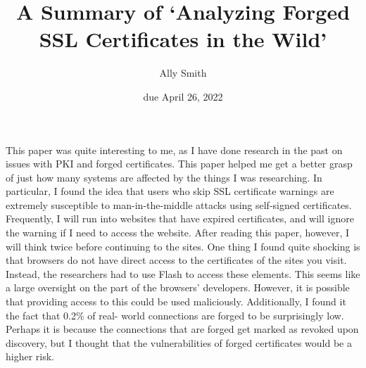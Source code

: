 \documentclass[12pt]{article}
\title{\bf A Summary of `Analyzing Forged SSL Certificates in the Wild'}
\author{Ally Smith}
\date{due April 26, 2022}
\begin{document}
\maketitle{}

This paper was quite interesting to me, as I have done research in the past on
issues with PKI and forged certificates. This paper helped me get a better grasp
of just how many systems are affected by the things I was researching. In
particular, I found the idea that users who skip SSL certificate warnings are
extremely susceptible to man-in-the-middle attacks using self-signed
certificates. Frequently, I will run into websites that have expired
certificates, and will ignore the warning if I need to access the website. After
reading this paper, however, I will think twice before continuing to the sites.
One thing I found quite shocking is that browsers do not have direct access to
the certificates of the sites you visit. Instead, the researchers had to use
Flash to access these elements. This seems like a large oversight on the part of
the browsers' developers. However, it is possible that providing access to this
could be used maliciously. Additionally, I found it the fact that 0.2\% of real-
world connections are forged to be surprisingly low. Perhaps it is because the
connections that are forged get marked as revoked upon discovery, but I thought
that the vulnerabilities of forged certificates would be a higher risk.
\end{document}
